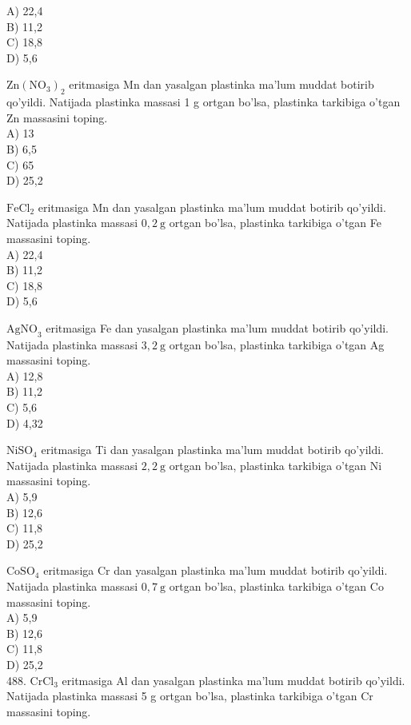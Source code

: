 A) 22,4\\
B) 11,2\\
C) 18,8\\
D) 5,6
  \item $\mathrm{Zn}\left(\mathrm{NO}_{3}\right)_{2}$ eritmasiga Mn dan yasalgan plastinka ma'lum muddat botirib qo'yildi. Natijada plastinka massasi 1 g ortgan bo'lsa, plastinka tarkibiga o'tgan Zn massasini toping.\\
A) 13\\
B) 6,5\\
C) 65\\
D) 25,2
  \item $\mathrm{FeCl}_{2}$ eritmasiga Mn dan yasalgan plastinka ma'lum muddat botirib qo'yildi. Natijada plastinka massasi $0,2 \mathrm{~g}$ ortgan bo'lsa, plastinka tarkibiga o'tgan Fe massasini toping.\\
A) 22,4\\
B) 11,2\\
C) 18,8\\
D) 5,6
  \item $\mathrm{AgNO}_{3}$ eritmasiga Fe dan yasalgan plastinka ma'lum muddat botirib qo'yildi. Natijada plastinka massasi $3,2 \mathrm{~g}$ ortgan bo'lsa, plastinka tarkibiga o'tgan Ag massasini toping.\\
A) 12,8\\
B) 11,2\\
C) 5,6\\
D) 4,32
  \item $\mathrm{NiSO}_{4}$ eritmasiga Ti dan yasalgan plastinka ma'lum muddat botirib qo'yildi. Natijada plastinka massasi $2,2 \mathrm{~g}$ ortgan bo'lsa, plastinka tarkibiga o'tgan Ni massasini toping.\\
A) 5,9\\
B) 12,6\\
C) 11,8\\
D) 25,2
  \item $\mathrm{CoSO}_{4}$ eritmasiga Cr dan yasalgan plastinka ma'lum muddat botirib qo'yildi. Natijada plastinka massasi $0,7 \mathrm{~g}$ ortgan bo'lsa, plastinka tarkibiga o'tgan Co massasini toping.\\
A) 5,9\\
B) 12,6\\
C) 11,8\\
D) 25,2\\
488. $\mathrm{CrCl}_{3}$ eritmasiga Al dan yasalgan plastinka ma'lum muddat botirib qo'yildi. Natijada plastinka massasi 5 g ortgan bo'lsa, plastinka tarkibiga o'tgan Cr massasini toping.\\
